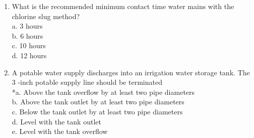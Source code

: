 \begin{enumerate}[1.]
\item What is the recommended minimum contact time water mains with the chlorine slug method?\\
a. 3 hours\\
b. 6 hours\\
c. 10 hours\\
d. 12 hours\\


\item A potable water supply discharges into an irrigation water storage tank. The 3 -inch potable supply line should be terminated\\
*a. Above the tank overflow by at least two pipe diameters\\
b. Above the tank outlet by at least two pipe diameters\\
c. Below the tank outlet by at least two pipe diameters\\
d. Level with the tank outlet\\
e. Level with the tank overflow\\


\end{enumerate}
